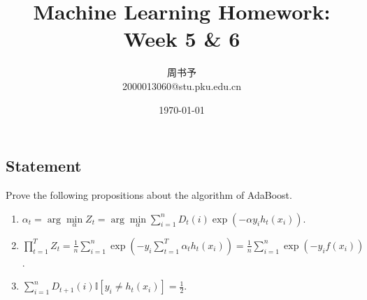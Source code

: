 \documentclass[8pt]{article}
\title{\heiti\zihao{2} Machine Learning Homework: Week 5 \& 6}
\author{\kaishu\zihao{-3} 周书予\\2000013060@stu.pku.edu.cn}
\date{\today}
\theoremstyle{compact}
\begin{document}
\pagestyle{plain}
\maketitle

\section{}
\subsection*{Statement}

Prove the following propositions about the algorithm of AdaBoost.
\begin{enumerate}
	\item $\alpha_t = \arg\min\limits_{\alpha}Z_t = \arg\min\limits_{\alpha} \sum\limits_{i=1}^{n}D_t(i)\exp(-\alpha y_i h_t(x_i))$.
	\item $\prod\limits_{t=1}^{T}Z_t = \frac1n \sum\limits_{i=1}^{n}\exp\left(-y_i\sum\limits_{t=1}^{T}\alpha_t h_t(x_i)\right) = \frac1n \sum\limits_{i=1}^{n}\exp\left(-y_if(x_i)\right)$.
	\item $\sum\limits_{i=1}^{n}D_{t+1}(i)\mathbb I[y_i \neq h_t(x_i)] = \frac12$.
\end{enumerate}
\end{document}
